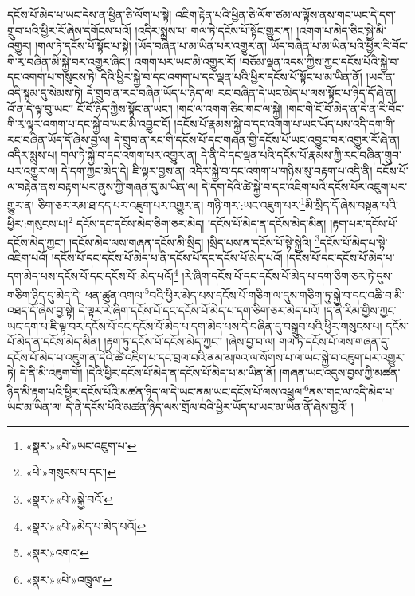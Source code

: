 དངོས་པོ་མེད་པ་ཡང་དེས་ན་ཕྱིན་ཅི་ལོག་པ་སྟེ། འཇིག་རྟེན་པའི་ཕྱིན་ཅི་ལོག་ཙམ་ལ་ལྟོས་ནས་གང་ཡང་དེ་དག་གྲུབ་པའི་ཕྱིར་རོ་ཞེས་དགོངས་པའོ། །འདིར་སྨྲས་པ། གལ་ཏེ་དངོས་པོ་སྟོང་གྱུར་ན། །འགག་པ་མེད་ཅིང་སྐྱེ་མི་འགྱུར། །གལ་ཏེ་དངོས་པོ་སྟོང་པ་སྟེ། །ཡོད་བཞིན་པ་མ་ཡིན་པར་འགྱུར་ན། ཡོད་བཞིན་པ་མ་ཡིན་པའི་ཕྱིར་རི་བོང་གི་རྭ་བཞིན་མི་སྐྱེ་བར་འགྱུར་ཞིང་། འགག་པར་ཡང་མི་འགྱུར་རོ། །བཅོམ་ལྡན་འདས་ཀྱིས་ཀྱང་དངོས་པོའི་སྐྱེ་བ་དང་འགག་པ་གསུངས་ཏེ། དེའི་ཕྱིར་སྐྱེ་བ་དང་འགག་པ་དང་ལྡན་པའི་ཕྱིར་དངོས་པོ་སྟོང་པ་མ་ཡིན་ནོ། །ཡང་ན་འདི་སྙམ་དུ་སེམས་ཏེ། དེ་གྲུབ་ན་རང་བཞིན་ཡོད་པ་ཉིད་ལ། རང་བཞིན་དེ་ཡང་མེད་པ་ལས་སྟོང་པ་ཉིད་དོ་ཞེ་ན། འོ་ན་དེ་ལྟ་བུ་ཡང་། ངོ་བོ་ཉིད་ཀྱིས་སྟོང་ན་ཡང་། །གང་ལ་འགག་ཅིང་གང་ལ་སྐྱེ། །གང་གི་ངོ་བོ་མེད་ན་དེ་ན་རི་བོང་གི་རྭ་ལྟར་འགག་པ་དང་སྐྱེ་བ་ཡང་མི་འབྱུང་ངོ། །དངོས་པོ་རྣམས་སྐྱེ་བ་དང་འགག་པ་ཡང་ཡོད་པས་འདི་དག་གི་རང་བཞིན་ཡོད་དོ་ཞེས་བྱ་ལ། དེ་གྲུབ་ན་རང་གི་དངོས་པོ་དང་གཞན་གྱི་དངོས་པོ་ཡང་འབྱུང་བར་འགྱུར་རོ་ཞེ་ན། འདིར་སྨྲས་པ། གལ་ཏེ་སྐྱེ་བ་དང་འགག་པར་འགྱུར་ན། དེ་ནི་དེ་དང་ལྡན་པའི་དངོས་པོ་རྣམས་ཀྱི་རང་བཞིན་གྲུབ་པར་འགྱུར་ལ། དེ་དག་ཀྱང་མེད་དེ། ཇི་ལྟར་བྱས་ན། འདིར་སྐྱེ་བ་དང་འགག་པ་གཉིས་སུ་བརྟག་པ་འདི་ནི། དངོས་པོ་ལ་བརྟེན་ནས་བརྟག་པར་ནུས་ཀྱི་གཞན་དུ་མ་ཡིན་ལ། དེ་དག་དེའི་ཚེ་སྐྱེ་བ་དང་འཇིག་པའི་དངོས་པོར་འཇུག་པར་གྱུར་ན། ཅིག་ཅར་རམ་ཐ་དད་པར་འཇུག་པར་འགྱུར་ན། གཉི་གར་:ཡང་འཇུག་པར་\footnote{«སྣར་»«པེ་»ཡང་འཇུག་པ་}མི་སྲིད་དོ་ཞེས་བསྟན་པའི་ཕྱིར་:གསུངས་པ།\footnote{«པེ་»གསུངས་པ་དང་།} དངོས་དང་དངོས་མེད་ཅིག་ཅར་མེད། །དངོས་པོ་མེད་ན་དངོས་མེད་མིན། །རྟག་པར་དངོས་པོ་དངོས་མེད་ཀྱང་། །དངོས་མེད་ལས་གཞན་དངོས་མི་སྲིད། །སྲིད་པས་ན་དངོས་པོ་སྟེ་སྐྱེའི། \footnote{«སྣར་»«པེ་»སྐྱེ་བའོ་}དངོས་པོ་མེད་པ་སྟེ་འཇིག་པའོ། །དངོས་པོ་དང་དངོས་པོ་མེད་པ་ནི་དངོས་པོ་དང་དངོས་པོ་མེད་པའོ། །དངོས་པོ་དང་དངོས་པོ་མེད་པ་དག་མེད་པས་དངོས་པོ་དང་དངོས་པོ་:མེད་པའོ།\footnote{«སྣར་»«པེ་»མེད་པ་མེད་པའོ།} །རེ་ཞིག་དངོས་པོ་དང་དངོས་པོ་མེད་པ་དག་ཅིག་ཅར་ཏེ་དུས་གཅིག་ཉིད་དུ་མེད་དེ། ཕན་ཚུན་འགལ་\footnote{«སྣར་»འགའ་}བའི་ཕྱིར་མེད་པས་དངོས་པོ་གཅིག་ལ་དུས་གཅིག་ཏུ་སྐྱེ་བ་དང་འཆི་བ་མི་འཐད་དོ་ཞེས་བྱ་སྟེ། དེ་ལྟར་རེ་ཞིག་དངོས་པོ་དང་དངོས་པོ་མེད་པ་དག་ཅིག་ཅར་མེད་པའོ། །ད་ནི་རིམ་གྱིས་ཀྱང་ཡང་དག་པ་ཇི་ལྟ་བར་དངོས་པོ་དང་དངོས་པོ་མེད་པ་དག་མེད་པས་དེ་བཞིན་དུ་བསྒྲུབ་པའི་ཕྱིར་གསུངས་པ། དངོས་པོ་མེད་ན་དངོས་མེད་མིན། །རྟག་ཏུ་དངོས་པོ་དངོས་མེད་ཀྱང་། །ཞེས་བྱ་བ་ལ། གལ་ཏེ་དངོས་པོ་ལས་གཞན་དུ་དངོས་པོ་མེད་པ་འཇུག་ན་དེའི་ཚེ་འཇིག་པ་དང་བྲལ་བའི་ནམ་མཁའ་ལ་སོགས་པ་ལ་ཡང་སྐྱེ་བ་འཇུག་པར་འགྱུར་ཏེ། དེ་ནི་མི་འཇུག་གོ། །དེའི་ཕྱིར་དངོས་པོ་མེད་ན་དངོས་པོ་མེད་པ་མ་ཡིན་ནོ། །གཞན་ཡང་འདུས་བྱས་ཀྱི་མཚན་ཉིད་མི་རྟག་པའི་ཕྱིར་དངོས་པོའི་མཚན་ཉིད་ལ་དེ་ཡང་ནམ་ཡང་དངོས་པོ་ལས་འཕྲུལ་\footnote{«སྣར་»«པེ་»འཁྲུལ་}ནས་གང་ལ་འདི་མེད་པ་ཡང་མ་ཡིན་ལ། དེ་ནི་དངོས་པོའི་མཚན་ཉིད་ལས་གྲོལ་བའི་ཕྱིར་ཡོད་པ་ཡང་མ་ཡིན་ནོ་ཞེས་བྱའོ། །
